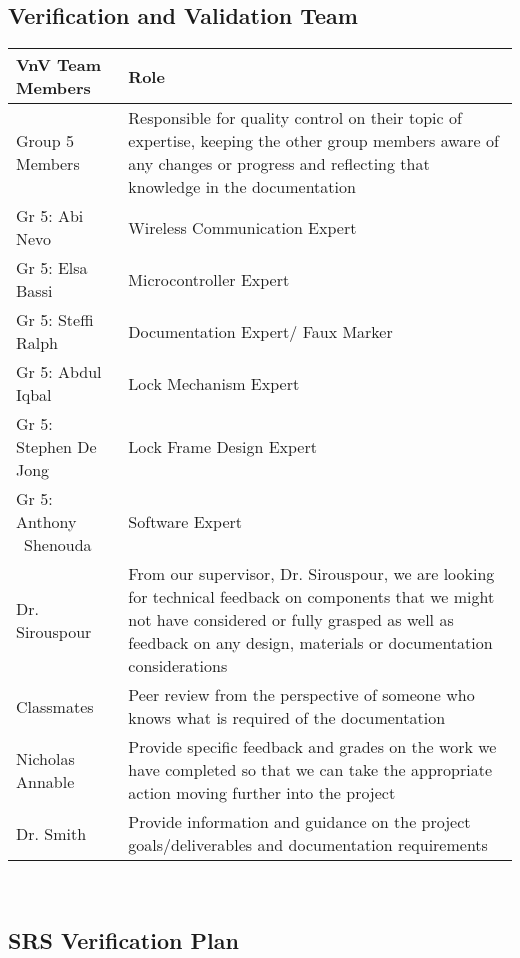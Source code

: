 \documentclass[12pt, titlepage]{article}
\begin{document}
\subsection{Verification and Validation Team}

 \begin{minipage}{\textwidth}
\renewcommand*{\arraystretch}{1.5}
\begin{tabular}{| p{} | p{} |}
 \hline
 VnV Team Members & Role \\ 
  \hline
 Group 5 Members & Responsible for quality control on their topic of expertise, keeping the other group members aware of any changes or progress and reflecting that knowledge in the documentation\\ 
 \hline
Gr 5: Abi Nevo & Wireless Communication Expert \\ 
  \hline
 Gr 5: Elsa Bassi & Microcontroller Expert \\ 
  \hline
 Gr 5: Steffi Ralph & Documentation Expert/ Faux Marker \\ 
  \hline
 Gr 5: Abdul Iqbal & Lock Mechanism Expert \\ 
  \hline
 Gr 5: Stephen De Jong & Lock Frame Design Expert \\ 
  \hline
  Gr 5: Anthony
  ~\newline Shenouda & Software Expert \\ 
  \hline
   Dr. Sirouspour & From our supervisor, Dr. Sirouspour, we are looking for technical feedback on components that we might not have considered or fully grasped as well as feedback on any design, materials or documentation considerations\\
  \hline
    Classmates & Peer review from the perspective of someone who knows what is required of the documentation \\
  \hline
   Nicholas Annable & Provide specific feedback and grades on the work we have completed so that we can take the appropriate action moving further into the project\\
  \hline
  Dr. Smith & Provide information and guidance on the project goals/deliverables and documentation requirements \\
  \hline

\end{tabular}
\end{minipage}\\

\subsection{SRS Verification Plan}
\end{document}
